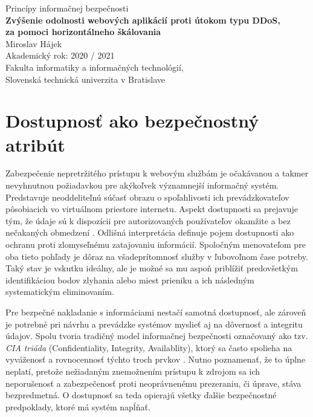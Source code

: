 \documentclass[12pt, a4paper]{article}
\begin{document}
\begin{titlepage}
    \hspace{0pt}
    \centering
    \vfill
    \large Princípy informačnej bezpečnosti \\
    \vspace{0.4cm}
    \vspace{1cm}
    \large \textbf{Zvýšenie odolnosti webových aplikácií proti útokom typu DDoS, 
          \\za pomoci horizontálneho škálovania  \\}
    \vspace{2.5cm}
    \normalsize Miroslav Hájek \\[0.2cm]
	Akademický rok: 2020 / 2021 \\[0.1cm]
	Fakulta informatiky a informačných technológií, \\
	Slovenská technická univerzita v Bratislave
    \vfill
\end{titlepage}


\tableofcontents
\newpage
{}
\setcounter{page}{1}

\section{Dostupnosť ako bezpečnostný atribút}
Zabezpečenie nepretržitého prístupu k webovým službám je očakávanou a takmer nevyhnutnou požiadavkou pre 
akýkoľvek významnejší informačný systém. Predstavuje neoddeliteľnú súčasť obrazu o spoľahlivosti 
ich prevádzkovateľov pôsobiacich vo virtuálnom priestore internetu. Aspekt dostupnosti sa prejavuje tým,
že údaje sú k dispozícii pre autorizovaných používateľov okamžite a bez nečakaných obmedzení   
 \cite{availability}. Odlišná interpretácia definuje pojem dostupnosti ako ochranu proti zlomyseľnému 
zatajovaniu informácií. Spoločným menovateľom pre oba tieto pohľady je dôraz na všadeprítomnosť služby v 
ľubovoľnom čase potreby. Taký stav je vskutku ideálny, ale je možné sa mu aspoň priblížiť predovšetkým 
identifikáciou bodov zlyhania alebo miest prieniku a ich následným systematickým eliminovaním.

Pre bezpečné nakladanie s informáciami nestačí samotná dostupnosť, ale zároveň je potrebné pri návrhu a 
prevádzke systémov myslieť aj na dôvernosť a integritu údajov. Spolu tvoria tradičný model informačnej 
bezpečnosti označovaný ako tzv. \emph{CIA triáda} (Confidentiality, Integrity, Availablity), ktorý sa často 
spolieha na vyváženosť a rovnocennosť týchto troch prvkov \cite{availability}. Nutno poznamenať, 
že to úplne neplatí, pretože nežiadaným znemožnením prístupu k zdrojom sa ich neporušenosť a zabezpečenosť 
proti neoprávnenému prezeraniu, či úprave, stáva bezpredmetná. O dostupnosť sa teda opierajú všetky ďalšie
bezpečnostné predpoklady, ktoré má systém napĺňať.
\end{document}
